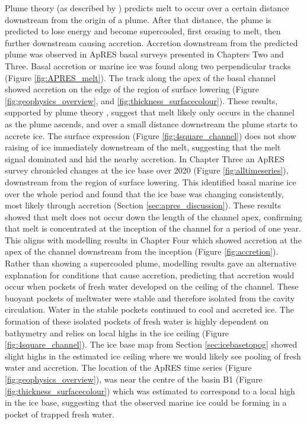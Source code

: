 Plume theory (as described by \cite{jenkins2011convection}) predicts melt to occur over a certain distance downstream from the origin of a plume. After that distance, the plume is predicted to lose energy and become supercooled, first ceasing to melt, then further downstream causing accretion.
Accretion downstream from the predicted plume was observed in ApRES basal surveys presented in Chapters Two and Three. Basal accretion or marine ice was found along two perpendicular tracks (Figure \ref{fig:APRES_melt}). The track along the apex of the basal channel showed  accretion on the edge of the region of surface lowering (Figure \ref{fig:geophysics_overview}, and \ref{fig:thickness_surfacecolour}). These results, supported by plume theory \citep{jenkins1991one}, suggest that melt likely only occurs in the channel as the plume ascends, and over a small distance downstream the plume starts to accrete ice. The surface expression (Figure \ref{fig:4square_channel}) does not show raising of ice immediately downstream of the melt, suggesting that the  melt signal dominated and hid the nearby accretion.
In Chapter Three an ApRES survey chronicled changes at the ice base over 2020 (Figure \ref{fig:alltimeseries}), downstream from the region of surface lowering. This identified basal marine ice over the whole period and found that the ice base was changing consistently, most likely through accretion (Section \ref{sec:apres_discussion}). These results showed that melt does not occur down the length of the channel apex, confirming that melt is concentrated at the inception of the channel for a period of one year.
This aligns with modelling results in Chapter Four which showed accretion at the apex of the channel downstream from the inception (Figure \ref{fig:accretion}).  Rather than showing a supercooled plume, modelling results gave an alternative explanation for conditions that cause accretion, predicting that accretion would occur when pockets of fresh water developed on the ceiling of the channel. These buoyant pockets of meltwater were stable and therefore isolated from the cavity circulation. Water in the stable pockets continued to cool and accreted ice. The formation of these isolated pockets of fresh water is highly dependent on bathymetry and relies on local highs in the ice ceiling (Figure \ref{fig:4square_channel}). 
The ice base map from Section \ref{sec:icebasetopog} showed slight highs in the estimated ice ceiling where we would likely see pooling of fresh water and accretion. The location of the ApRES time series (Figure \ref{fig:geophysics_overview}), was near the centre of the basin B1 (Figure \ref{fig:thickness_surfacecolour}) which was estimated to correspond to a local high in the ice base, suggesting that the observed marine ice could be forming in a pocket of trapped fresh water.


